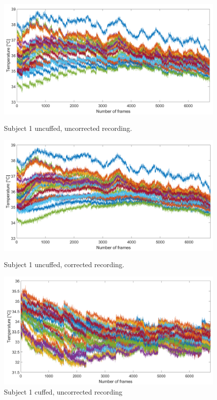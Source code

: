 
\begin{figure}[htbp]
	\begin{minipage}[b]{0.45\linewidth}
		\centering
		\includegraphics[width=\linewidth]{figures/Recordings/Sub1_uncuffed_uncorr}
		\caption{Subject 1 uncuffed, uncorrected recording.}
	
	\end{minipage}
	\hspace{0.2cm}
	\begin{minipage}[b]{0.45\linewidth}
		\centering
		\includegraphics[width=\linewidth]{figures/Recordings/Sub1_uncuffed_corr}
		\caption{Subject 1 uncuffed, corrected recording.}
	
	\end{minipage}
    \hspace{0.2cm}
	\begin{minipage}[b]{0.45\linewidth}
		\centering
		\includegraphics[width=\linewidth]{figures/Recordings/Sub1_cuffed_uncorr}
		\caption{Subject 1 cuffed, uncorrected recording}
		

\end{minipage}
\end{figure}
